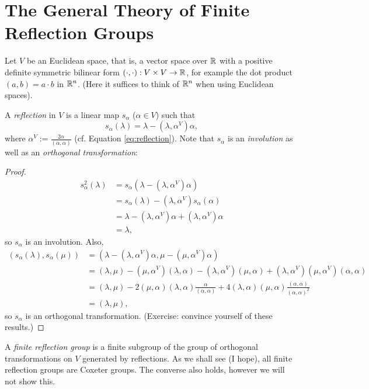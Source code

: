 \section{The General Theory of Finite Reflection Groups}

Let $V$ be an Euclidean space, that is,
a vector space over $\mathbb{R}$ with a positive definite
symmetric bilinear form $(\cdot, \cdot) : V \times V \to \mathbb{R}$,
for example the dot product $(a, b) = a \cdot b$ in $\mathbb{R}^n$.
(Here it suffices to think of $\mathbb{R}^n$ when using Euclidean spaces).

A {\em reflection} in $V$ is a linear map $s_\alpha$ ($\alpha \in V$)
such that
\[
    s_\alpha(\lambda) = \lambda - (\lambda, \alpha^V) \alpha,
\]
where $\alpha^V := \frac{2\alpha}{(\alpha,\alpha)}$ (cf. Equation
\eqref{eq:reflection}).
Note that $s_\alpha$ is an {\em involution} as well as an {\em orthogonal
transformation}:
\begin{proof}
\begin{align*}
s_\alpha^2(\lambda) &= s_\alpha(\lambda - (\lambda, \alpha^V) \alpha) \\
&= s_\alpha(\lambda) - (\lambda, \alpha^V) s_\alpha(\alpha) \\
&= \lambda - (\lambda, \alpha^V) \alpha + (\lambda, \alpha^V) \alpha \\
&= \lambda,
\end{align*}
so $s_\alpha$ is an involution. Also,
\begin{align*}
(s_\alpha(\lambda), s_\alpha(\mu))
&= (\lambda - (\lambda, \alpha^V) \alpha, \mu - (\mu, \alpha^V) \alpha) \\
&= (\lambda, \mu) - (\mu, \alpha^V) (\lambda, \alpha)
   - (\lambda, \alpha^V) (\mu, \alpha)
   + (\lambda, \alpha^V) (\mu, \alpha^V) (\alpha, \alpha) \\
&= (\lambda, \mu)
   - 2 (\mu, \alpha) (\lambda, \alpha) \frac{\alpha}{(\alpha, \alpha)}
   + 4 (\lambda, \alpha) (\mu, \alpha) \frac{(\alpha, \alpha)}{(\alpha, \alpha)^2} \\
&= (\lambda, \mu),
\end{align*}
so $s_\alpha$ is an orthogonal transformation. (Exercise: convince yourself of
these results.)
\end{proof}

A {\em finite reflection group} is a finite subgroup of the group of orthogonal
transformations on $V$ generated by reflections. As we shall see (I hope),
all finite reflection groups are Coxeter groups.
The converse also holds, however we will not show this.

